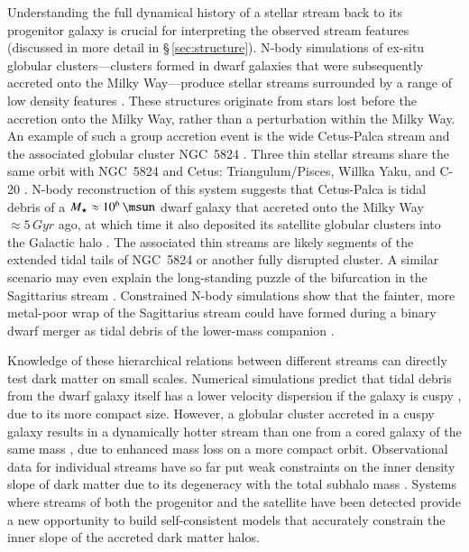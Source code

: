 \documentclass[final,5p,times,twocolumn,authoryear]{elsarticle}
\begin{document}
Understanding the full dynamical history of a stellar stream back to its progenitor galaxy is crucial for interpreting the observed stream features (discussed in more detail in \S\,\ref{sec:structure}).
N-body simulations of ex-situ globular clusters---clusters formed in dwarf galaxies that were subsequently accreted onto the Milky Way---produce stellar streams surrounded by a range of low density features \citep[e.g., wide envelopes, or cocoons, and/or sub-streams;][]{carlberg:2018,carlberg:2020,malhan:2019a,qian:2022}.
These structures originate from stars lost before the accretion onto the Milky Way, rather than a perturbation within the Milky Way.
An example of such a group accretion event is the wide Cetus-Palca stream and the associated globular cluster NGC~5824 \citep{yuan:2019,thomas:2022}.
Three thin stellar streams share the same orbit with NGC~5824 and Cetus: Triangulum/Pisces, Willka Yaku, and C-20 \citep{bonaca:2021, yuan:2022}.
N-body reconstruction of this system suggests that Cetus-Palca is tidal debris of a $M_\star\approx10^6\,\unit{\msun}$ dwarf galaxy that accreted onto the Milky Way $\approx5\,\unit{Gyr}$ ago, at which time it also deposited its satellite globular clusters into the Galactic halo \citep{chang:2020}.
The associated thin streams are likely segments of the extended tidal tails of NGC~5824 or another fully disrupted cluster.
A similar scenario may even explain the long-standing puzzle of the bifurcation in the Sagittarius stream \citep{belokurov:2006, koposov:2012}.
Constrained N-body simulations show that the fainter, more metal-poor wrap of the Sagittarius stream \citep[e.g.,][]{ramos:2022} could have formed during a binary dwarf merger as tidal debris of the lower-mass companion \citep{davies:2024a,davies:2024b}.

Knowledge of these hierarchical relations between different streams can directly test dark matter on small scales.
Numerical simulations predict that tidal debris from the dwarf galaxy itself has a lower velocity dispersion if the galaxy is cuspy \citep{errani:2015}, due to its more compact size.
However, a globular cluster accreted in a cuspy galaxy results in a dynamically hotter stream than one from a cored galaxy of the same mass \citep{malhan:2021}, due to enhanced mass loss on a more compact orbit.
Observational data for individual streams have so far put weak constraints on the inner density slope of dark matter due to its degeneracy with the total subhalo mass \citep{malhan:2022b}.
Systems where streams of both the progenitor and the satellite have been detected provide a new opportunity to build self-consistent models that accurately constrain the inner slope of the accreted dark matter halos.
\end{document}
